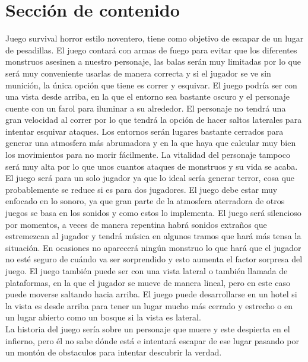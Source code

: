 \documentclass{article}
\begin{document}
\section{Sección de contenido} \label{contenido}
Juego survival horror estilo noventero, tiene como objetivo de escapar de un lugar de pesadillas. El juego contará con armas de fuego para evitar que los diferentes monstruos asesinen a nuestro personaje, las balas serán muy limitadas por lo que será muy conveniente usarlas de manera correcta y si el jugador se ve sin munición, la única opción que tiene es correr y esquivar. El juego podría ser con una vista desde arriba, en la que el entorno sea bastante oscuro y el personaje cuente con un farol para iluminar a su alrededor. El personaje no tendrá una gran velocidad al correr por lo que tendrá la opción de hacer saltos laterales para intentar esquivar ataques. Los entornos serán lugares bastante cerrados para generar una atmosfera más abrumadora y en la que haya que calcular muy bien los movimientos para no morir fácilmente. La vitalidad del personaje tampoco será muy alta por lo que unos cuantos ataques de monstruos y su vida se acaba. El juego será para un solo jugador ya que lo ideal sería generar terror, cosa que probablemente se reduce si es para dos jugadores. El juego debe estar muy enfocado en lo sonoro, ya que gran parte de la atmosfera aterradora de otros juegos se basa en los sonidos y como estos lo implementa. El juego será silencioso por momentos, a veces de manera repentina habrá sonidos extraños que estremezcan al jugador y tendrá música en algunos tramos que hará más tensa la situación. En ocasiones no aparecerá ningún monstruo lo que hará que el jugador no esté seguro de cuándo va ser sorprendido y esto aumenta el factor sorpresa del juego. El juego también puede ser con una vista lateral o también llamada de plataformas, en la que el jugador se mueve de manera lineal, pero en este caso puede moverse saltando hacia arriba. El juego puede desarrollarse en un hotel si la vista es desde arriba para tener un lugar mucho más cerrado y estrecho o en un lugar abierto como un bosque si la vista es lateral.\\ La historia del juego sería sobre un personaje que muere y este despierta en el infierno, pero él no sabe dónde está e intentará escapar de ese lugar pasando por un montón de obstaculos para intentar descubrir la verdad.
\end{document}
